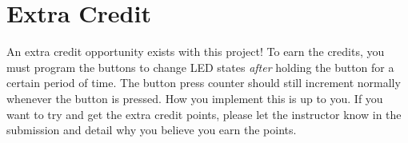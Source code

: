 \section*{Extra Credit}
An extra credit opportunity exists with this project! 
To earn the credits, you must program the buttons to change LED states \emph{after} holding the button for a certain period of time.
The button press counter should still increment normally whenever the button is pressed.
How you implement this is up to you.
If you want to try and get the extra credit points, please let the instructor know in the submission and detail why you believe you earn the points.

